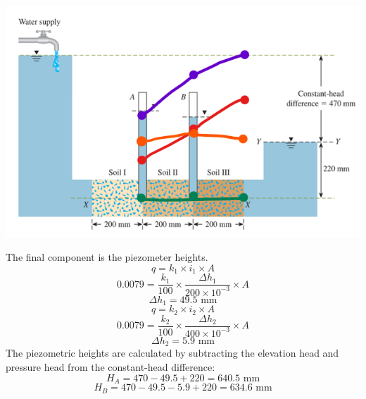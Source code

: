 \documentclass{article}
\begin{document}
\begin{center}
\includegraphics*[scale=0.8]{fig1.png}
\end{center}
The final component is the piezometer heights.
\[q=k_1\times i_1\times A\]
\[0.0079=\frac{k_1}{100}\times \frac{\Delta h_1}{200\times 10^{-3}}\times A\]
\[\Delta h_1 = 49.5\text{ mm}\] 
\[q=k_2\times i_2\times A\]
\[0.0079=\frac{k_2}{100}\times \frac{\Delta h_2}{400\times 10^{-3}}\times A\]
\[\Delta h_2 = 5.9\text{ mm}\] 
The piezometric heights are calculated by subtracting the elevation head and pressure head from the constant-head difference:
\[H_A=470-49.5+220=\boxed{640.5\text{ mm}}\] 
\[H_B=470-49.5-5.9+220=\boxed{634.6\text{ mm}}\]
\end{document}
